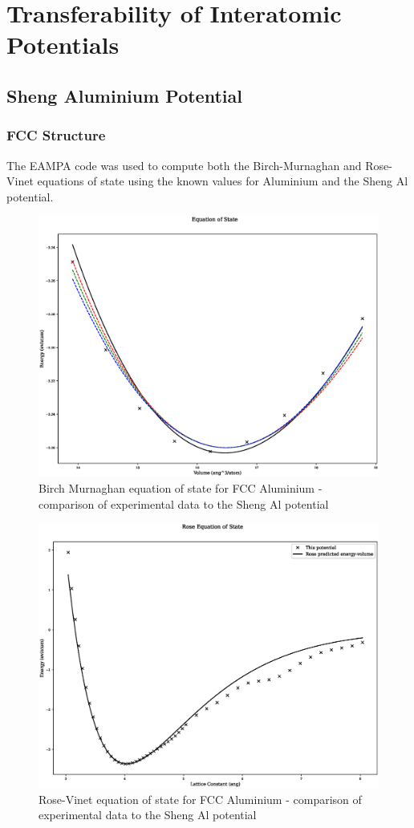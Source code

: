 \chapter[Transferability]{Transferability of Interatomic Potentials}
\label{section:transferabilityappendix}


\section{Sheng Aluminium Potential}
\label{section:alshengxfer}

\subsection{FCC Structure}

The EAMPA code was used to compute both the Birch-Murnaghan and Rose-Vinet equations of state using the known values for Aluminium and the Sheng Al potential\cite{shengeamonline}.  
 
\begin{figure}
  \begin{center}
    \includegraphics[width=0.6\linewidth]{appendix/transferability/transferability/Al_sheng/equation_of_state_bp_fcc.eps}
  \end{center}
	\caption{Birch Murnaghan equation of state for FCC Aluminium - comparison of experimental data to the Sheng Al potential}
	\label{fig:shengalfccbm}
\end{figure}

\begin{figure}
  \begin{center}
    \includegraphics[width=0.6\linewidth]{appendix/transferability/transferability/Al_sheng/rose_plot_bp_fcc.eps}
  \end{center}
	\caption{Rose-Vinet equation of state for FCC Aluminium - comparison of experimental data to the Sheng Al potential}
	\label{fig:shengalfccbm}
\end{figure}

